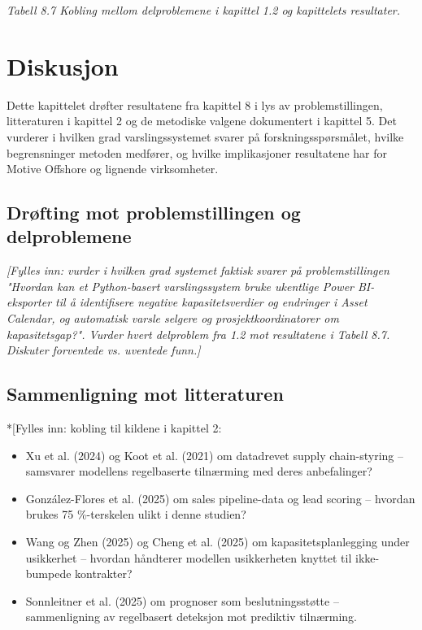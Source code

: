 \documentclass[a4paper,11pt]{article}
\begin{document}
\begin{center}\small\textit{Tabell 8.7 Kobling mellom delproblemene i kapittel 1.2 og kapittelets resultater.}\end{center}

\section{Diskusjon}

Dette kapittelet drøfter resultatene fra kapittel 8 i lys av problemstillingen, litteraturen i kapittel 2 og de metodiske valgene dokumentert i kapittel 5. Det vurderer i hvilken grad varslingssystemet svarer på forskningsspørsmålet, hvilke begrensninger metoden medfører, og hvilke implikasjoner resultatene har for Motive Offshore og lignende virksomheter.

\subsection{Drøfting mot problemstillingen og delproblemene}

\textit{[Fylles inn: vurder i hvilken grad systemet faktisk svarer på problemstillingen "Hvordan kan et Python-basert varslingssystem bruke ukentlige Power BI-eksporter til å identifisere negative kapasitetsverdier og endringer i Asset Calendar, og automatisk varsle selgere og prosjektkoordinatorer om kapasitetsgap?". Vurder hvert delproblem fra 1.2 mot resultatene i Tabell 8.7. Diskuter forventede vs. uventede funn.]}

\subsection{Sammenligning mot litteraturen}

*[Fylles inn: kobling til kildene i kapittel 2:

\begin{itemize}
\item Xu et al. (2024) og Koot et al. (2021) om datadrevet supply chain-styring – samsvarer modellens regelbaserte tilnærming med deres anbefalinger?
\item González-Flores et al. (2025) om sales pipeline-data og lead scoring – hvordan brukes 75 \%-terskelen ulikt i denne studien?
\item Wang og Zhen (2025) og Cheng et al. (2025) om kapasitetsplanlegging under usikkerhet – hvordan håndterer modellen usikkerheten knyttet til ikke-bumpede kontrakter?
\item Sonnleitner et al. (2025) om prognoser som beslutningsstøtte – sammenligning av regelbasert deteksjon mot prediktiv tilnærming.
\end{itemize}
\end{document}
